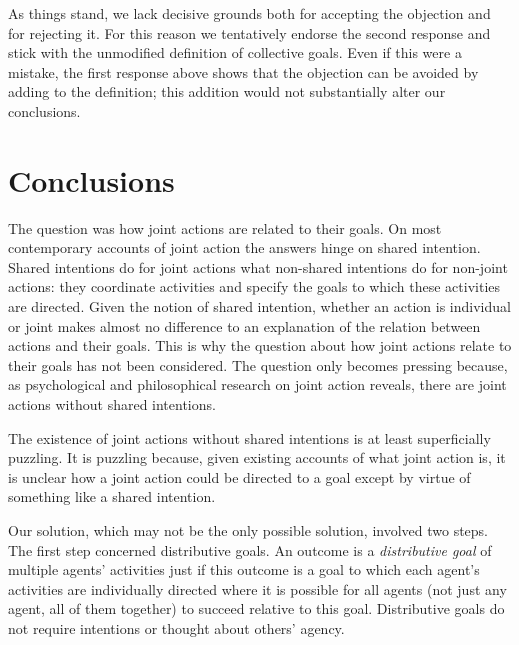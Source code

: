 \documentclass[12pt,a4paper]{extarticle}
\begin{document}
As things stand, we lack decisive grounds both for accepting the objection and for rejecting it.
For this reason we tentatively endorse the second response and stick with the unmodified definition of collective goals.
Even if this were a mistake, the first response above shows that the objection can be avoided by adding to the definition; this addition would not substantially alter our conclusions.


\section{Conclusions}

The question was how joint actions are related to their goals.
On most contemporary accounts of joint action the answers hinge on shared intention.
Shared intentions do  for joint actions what non-shared intentions do for non-joint actions: they coordinate activities and specify the goals to which these activities are directed.
Given the notion of shared intention, whether an action is individual or joint makes almost no difference to an explanation of  the relation between actions and their goals.
This is why the question about how  joint actions relate to their goals has not been considered.  
The question only becomes pressing because, as psychological and philosophical research on joint action reveals, there are joint actions without shared intentions.

The existence of joint actions without shared intentions is at least superficially puzzling.
It is puzzling because, 
given existing accounts of what joint action is, 
it is unclear how a joint action could be directed to a goal except by virtue of something like a shared intention.

Our solution, which may not be the only possible solution, involved two steps.  
The first step concerned distributive goals.  
An outcome is a \emph{distributive goal} of multiple agents' activities just if this outcome is a goal to which each agent's activities are individually directed where it is possible for all agents  (not just any agent, all of them together) to succeed relative to this goal.
Distributive goals  do not require intentions or thought about others' agency.
\end{document}
